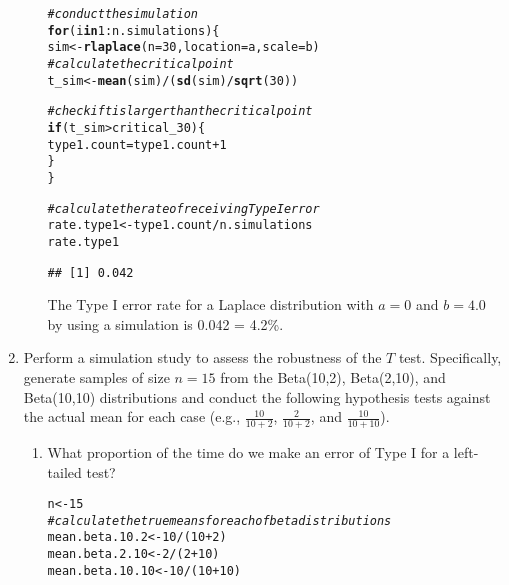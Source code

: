 \documentclass{article}\usepackage[]{graphicx}\usepackage[]{xcolor}
\makeatletter
\newcommand{\hlnum}[1]{\textcolor[rgb]{0.686,0.059,0.569}{#1}}%
\newcommand{\hlcom}[1]{\textcolor[rgb]{0.678,0.584,0.686}{\textit{#1}}}%
\newcommand{\hlopt}[1]{\textcolor[rgb]{0,0,0}{#1}}%
\newcommand{\hldef}[1]{\textcolor[rgb]{0.345,0.345,0.345}{#1}}%
\newcommand{\hlkwa}[1]{\textcolor[rgb]{0.161,0.373,0.58}{\textbf{#1}}}%
\newcommand{\hlkwb}[1]{\textcolor[rgb]{0.69,0.353,0.396}{#1}}%
\newcommand{\hlkwc}[1]{\textcolor[rgb]{0.333,0.667,0.333}{#1}}%
\newcommand{\hlkwd}[1]{\textcolor[rgb]{0.737,0.353,0.396}{\textbf{#1}}}%
\newenvironment{kframe}{%
 \def\at@end@of@kframe{}%
 \ifinner\ifhmode%
  \def\at@end@of@kframe{\end{minipage}}%
  \begin{minipage}{\columnwidth}%
 \fi\fi%
 \def\FrameCommand##1{\hskip\@totalleftmargin \hskip-\fboxsep
 \colorbox{shadecolor}{##1}\hskip-\fboxsep
     \hskip-\linewidth \hskip-\@totalleftmargin \hskip\columnwidth}%
 \MakeFramed {\advance\hsize-\width
   \@totalleftmargin\z@ \linewidth\hsize
   \@setminipage}}%
 {\par\unskip\endMakeFramed%
 \at@end@of@kframe}
\newenvironment{knitrout}{}{} %
\makeatother
\begin{document}
\begin{enumerate}
\begin{enumerate}
\begin{knitrout}
\begin{kframe}
\begin{alltt}
\hlcom{#conduct the simulation}
\hlkwa{for} \hldef{(i} \hlkwa{in} \hlnum{1}\hlopt{:}\hldef{n.simulations)\{}
\hldef{sim} \hlkwb{<-} \hlkwd{rlaplace}\hldef{(}\hlkwc{n} \hldef{=} \hlnum{30}\hldef{,} \hlkwc{location} \hldef{= a,} \hlkwc{scale} \hldef{= b)}
\hlcom{#calculate the critical point}
\hldef{t_sim} \hlkwb{<-} \hlkwd{mean}\hldef{(sim)}\hlopt{/} \hldef{(}\hlkwd{sd}\hldef{(sim)}\hlopt{/}\hlkwd{sqrt}\hldef{(}\hlnum{30}\hldef{))}

\hlcom{#check if t is larger than the critical point}
\hlkwa{if} \hldef{(t_sim} \hlopt{>} \hldef{critical_30)\{}
  \hldef{type1.count} \hlkwb{=} \hldef{type1.count} \hlopt{+} \hlnum{1}
\hldef{\}}
\hldef{\}}

\hlcom{#calculate the rate of receiving Type I error }
\hldef{rate.type1} \hlkwb{<-} \hldef{type1.count}\hlopt{/}\hldef{n.simulations}
\hldef{rate.type1}
\end{alltt}
\begin{verbatim}
## [1] 0.042
\end{verbatim}
\end{kframe}
\end{knitrout}
The Type I error rate for a Laplace distribution with $a=0$ and $b=4.0$ by using a simulation is 0.042 = 4.2\%. 
\end{enumerate}
  \item Perform a simulation study to assess the robustness of the $T$ test. 
  Specifically, generate samples of size $n=15$ from the Beta(10,2), Beta(2,10), 
  and Beta(10,10) distributions and conduct the following hypothesis tests against 
  the actual mean for each case (e.g., $\frac{10}{10+2}$, $\frac{2}{10+2}$, and 
  $\frac{10}{10+10}$). 
  \begin{enumerate}
    \item What proportion of the time do we make an error of Type I for a
    left-tailed test?
\begin{knitrout}\scriptsize
{}\color{fgcolor}\begin{kframe}
\begin{alltt}
\hldef{n} \hlkwb{<-}\hlnum{15}
\hlcom{#calculate the true means for each of beta distributions}
\hldef{mean.beta.10.2} \hlkwb{<-} \hlnum{10}\hlopt{/}\hldef{(}\hlnum{10}\hlopt{+}\hlnum{2}\hldef{)}
\hldef{mean.beta.2.10} \hlkwb{<-} \hlnum{2}\hlopt{/}\hldef{(}\hlnum{2}\hlopt{+}\hlnum{10}\hldef{)}
\hldef{mean.beta.10.10} \hlkwb{<-} \hlnum{10}\hlopt{/}\hldef{(}\hlnum{10}\hlopt{+}\hlnum{10}\hldef{)}


\end{alltt}
\end{kframe}
\end{knitrout}
\end{enumerate}
\end{enumerate}
\end{document}

